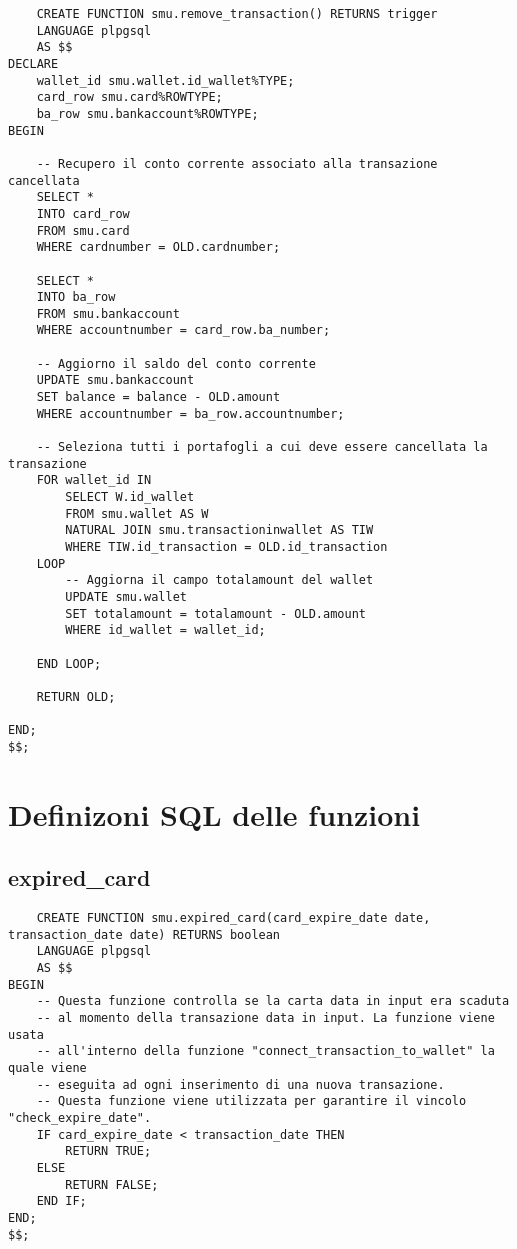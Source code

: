 \begin{lstlisting}
    CREATE FUNCTION smu.remove_transaction() RETURNS trigger
    LANGUAGE plpgsql
    AS $$
DECLARE
    wallet_id smu.wallet.id_wallet%TYPE;
    card_row smu.card%ROWTYPE;
    ba_row smu.bankaccount%ROWTYPE;
BEGIN

    -- Recupero il conto corrente associato alla transazione cancellata
    SELECT *
    INTO card_row
    FROM smu.card
    WHERE cardnumber = OLD.cardnumber;

    SELECT *
    INTO ba_row
    FROM smu.bankaccount
    WHERE accountnumber = card_row.ba_number;

    -- Aggiorno il saldo del conto corrente
    UPDATE smu.bankaccount
    SET balance = balance - OLD.amount
    WHERE accountnumber = ba_row.accountnumber;

    -- Seleziona tutti i portafogli a cui deve essere cancellata la transazione
    FOR wallet_id IN
        SELECT W.id_wallet
        FROM smu.wallet AS W
        NATURAL JOIN smu.transactioninwallet AS TIW 
        WHERE TIW.id_transaction = OLD.id_transaction
    LOOP
        -- Aggiorna il campo totalamount del wallet
        UPDATE smu.wallet
        SET totalamount = totalamount - OLD.amount
        WHERE id_wallet = wallet_id;

    END LOOP;

    RETURN OLD;
	
END;
$$;

\end{lstlisting}

\section{Definizoni SQL delle funzioni}

\subsection{expired\_card}

\begin{lstlisting}
    CREATE FUNCTION smu.expired_card(card_expire_date date, transaction_date date) RETURNS boolean
    LANGUAGE plpgsql
    AS $$
BEGIN
    -- Questa funzione controlla se la carta data in input era scaduta
    -- al momento della transazione data in input. La funzione viene usata
    -- all'interno della funzione "connect_transaction_to_wallet" la quale viene
    -- eseguita ad ogni inserimento di una nuova transazione.
    -- Questa funzione viene utilizzata per garantire il vincolo "check_expire_date".
    IF card_expire_date < transaction_date THEN
        RETURN TRUE;
    ELSE
        RETURN FALSE;
    END IF;
END;
$$;
\end{lstlisting}